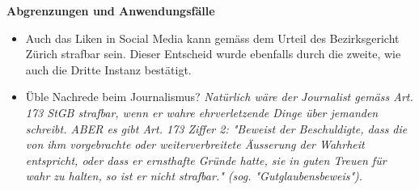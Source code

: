 \documentclass{report}
\theoremstyle{definition}
\theoremstyle{example}
\begin{document}
\textbf{Abgrenzungen und Anwendungsfälle}
\begin{itemize}
   \item Auch das Liken in Social Media kann gemäss dem Urteil des Bezirksgericht Zürich strafbar sein. Dieser Entscheid wurde ebenfalls durch die zweite, wie auch die Dritte Instanz bestätigt.
   \item Üble Nachrede beim Journalismus? \textit{Natürlich wäre der Journalist gemäss Art. 173 StGB strafbar, wenn er wahre ehrverletzende Dinge über jemanden schreibt. ABER es gibt Art. 173 Ziffer 2: "Beweist der Beschuldigte, dass die von ihm vorgebrachte oder weiterverbreitete Äusserung der Wahrheit entspricht, oder dass er ernsthafte Gründe hatte, sie in guten Treuen für wahr zu halten, so ist er nicht strafbar." (sog. "Gutglaubensbeweis").}
\end{itemize}
\end{document}

